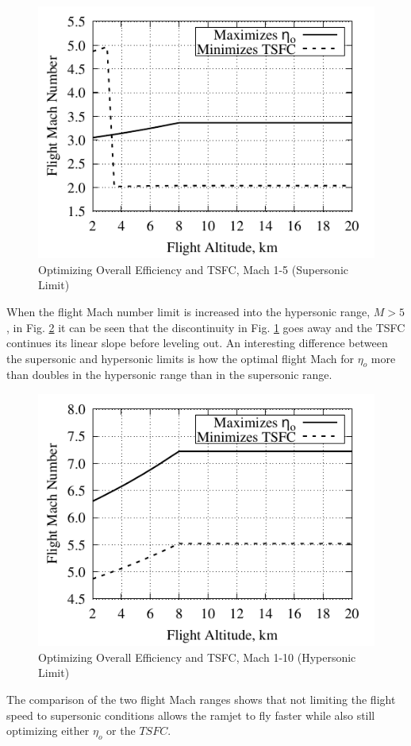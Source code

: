 \documentclass[conf]{new-aiaa} %
\begin{document}
\begin{figure}[H] %
    \centering
    \includegraphics[]{media/performance_parameter_files/part_e_range_1_5.pdf}
    \caption{\label{fig:parte1-5}Optimizing Overall Efficiency and TSFC, Mach 1-5 (Supersonic Limit)}
\end{figure}
When the flight Mach number limit is increased into the hypersonic range, $M>5$, in Fig. \ref{fig:parte1-10} it can be seen that the discontinuity in Fig. \ref{fig:parte1-5} goes away and the TSFC continues its linear slope before leveling out. An interesting difference between the supersonic and hypersonic limits is how the optimal flight Mach for $\eta_o$ more than doubles in the hypersonic range than in the supersonic range.

\begin{figure}[H] %
    \centering
    \includegraphics[]{media/performance_parameter_files/part_e_range_1_10.pdf}
    \caption{\label{fig:parte1-10}Optimizing Overall Efficiency and TSFC, Mach 1-10 (Hypersonic Limit)}
\end{figure}
The comparison of the two flight Mach ranges shows that not limiting the flight speed to supersonic conditions allows the ramjet to fly faster while also still optimizing either $\eta_o$ or the $TSFC$.
\end{document}
